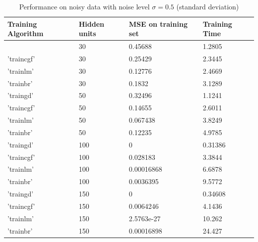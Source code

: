 \begin{table}[!htpb]
\begin{subtable}{.52\linewidth}
	\end{subtable}%
\begin{subtable}{.52\linewidth}
	\centering
	\caption{Performance on noisy data with noise level $\sigma = 0.5$ (standard deviation) }\label{table:1.2.2}
	\begin{tabular}[t]{|>{\centering}p{1.8cm}|p{1.1cm}|p{2cm}|p{1.6cm}|}
		\cellcolor{blue!25}Training Algorithm & \cellcolor{blue!25}Hidden units  & \cellcolor{blue!25} MSE on training set	 & \cellcolor{blue!25} Training Time	 \\ \hline
		{'traingd' }    &   30      &    0.45688     & 1.2805 \\ \hline
		{'traincgf'}    &   30      &    0.25429     & 2.3445 \\ \hline
		{'trainlm' }    &   30      &    0.12776     & 2.4669\\ \hline
		{'trainbr' }    &   30      &    0.1832      & 3.1289\\ \hline
		{'traingd' }    &   50      &    0.32496     & 1.1241\\ \hline
		{'traincgf'}    &   50      &    0.14655     &   2.6011\\ \hline
		{'trainlm' }    &   50      &    0.067438    &   3.8249\\ \hline
		{'trainbr' }    &   50      &    0.12235     &   4.9785\\ \hline
		{'traingd' }    &   100     &    0           &  0.31386\\ \hline
		{'traincgf'}    &   100     &    0.028183    &   3.3844\\ \hline
		{'trainlm' }    &   100     &    0.00016868  &   6.6878\\ \hline
		{'trainbr' }    &   100     &    0.0036395   &   9.5772\\ \hline
		{'traingd' }    &   150     &    0           &  0.34608\\ \hline
		{'traincgf'}    &   150     &    0.0064246   &   4.1436\\ \hline
		{'trainlm' }    &   150     &    2.5763e-27  &   10.262\\ \hline
		{'trainbr' }    &   150     &    0.00016898  &   24.427\\ \hline
	\end{tabular}
\end{subtable}%
\end{table}
